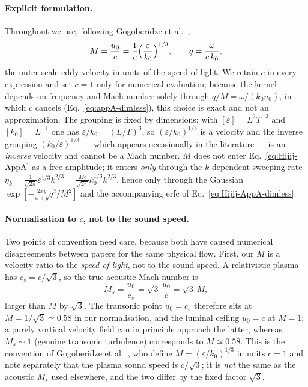 \documentclass[10pt,prd,aps,nobibnotes,superscriptaddress,preprintnumbers,notitlepage]{revtex4-1}
\begin{document}
\paragraph{Explicit formulation.}
Throughout we use, following Gogoberidze et al.~\cite{Gogoberidze:2007an},
\begin{equation}
  M=\frac{u_0}{c}=\frac{1}{c}\Bigl(\frac{\varepsilon}{k_0}\Bigr)^{1/3},
  \qquad q=\frac{\omega}{c\,k_0},
  \label{eq:mach-def}
\end{equation}
the outer-scale eddy velocity in units of the speed of light. We retain $c$ in
every expression and set $c=1$ only for numerical evaluation; because the kernel
depends on frequency and Mach number solely through $q/M=\omega/(k_0u_0)$, in
which $c$ cancels (Eq.~\eqref{eq:appA-dimless}), this choice is exact and not an
approximation. The grouping is fixed by dimensions: with $[\varepsilon]=L^2T^{-3}$
and $[k_0]=L^{-1}$ one has $\varepsilon/k_0=(L/T)^3$, so $(\varepsilon/k_0)^{1/3}$
is a velocity and the inverse grouping $(k_0/\varepsilon)^{1/3}$ — which appears
occasionally in the literature — is an \emph{inverse} velocity and cannot be a
Mach number. $M$ does not enter Eq.~\eqref{eq:Hijij-AppA} as a free amplitude; it
enters \emph{only} through the $k$-dependent sweeping rate
$\eta_k=\tfrac{1}{\sqrt{2\pi}}\varepsilon^{1/3}k^{2/3}
=\tfrac{Mc}{\sqrt{2\pi}}k_0^{1/3}k^{2/3}$, hence only through the Gaussian
$\exp[-\tfrac{2xy}{x+y}q^2/M^2]$ and the accompanying erfc of
Eq.~\eqref{eq:Hijij-AppA-dimless}.

\paragraph{Normalisation to $c$, not to the sound speed.}
Two points of convention need care, because both have caused numerical
disagreements between papers for the same physical flow. First, our $M$ is a
velocity ratio to the \emph{speed of light}, not to the sound speed. A
relativistic plasma has $c_s=c/\sqrt3$, so the true acoustic Mach number is
\begin{equation}
  M_s=\frac{u_0}{c_s}=\sqrt3\,\frac{u_0}{c}=\sqrt3\,M,
  \label{eq:acoustic-mach}
\end{equation}
larger than $M$ by $\sqrt3$. The transonic point $u_0=c_s$ therefore sits at
$M=1/\sqrt3\simeq0.58$ in our normalisation, and the luminal ceiling $u_0=c$ at
$M=1$; a purely vortical velocity field can in principle approach the latter,
whereas $M_s\sim1$ (genuine transonic turbulence) corresponds to $M\simeq0.58$.
This is the convention of Gogoberidze et al.~\cite{Gogoberidze:2007an}, who define
$M=(\varepsilon/k_0)^{1/3}$ in units $c=1$ and note separately that the plasma
sound speed is $c/\sqrt3$; it is \emph{not} the same as the acoustic $M_s$ used
elsewhere, and the two differ by the fixed factor $\sqrt3$.
\end{document}
